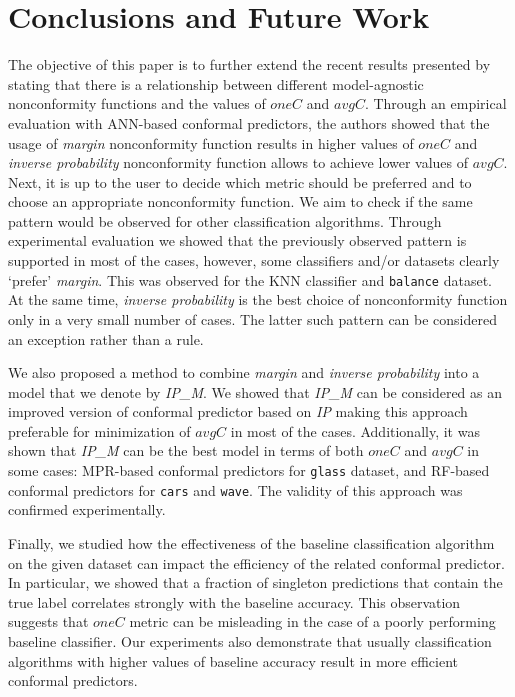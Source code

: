 \section{Conclusions and Future Work}
\label{sec:conclusions}

The objective of this paper is to further extend the recent results presented by
\cite{johansson2017model} stating that there is a relationship between different model-agnostic
nonconformity functions and the values of $oneC$ and $avgC$. Through an empirical evaluation with 
ANN-based conformal predictors, 
the authors showed that the usage of \textit{margin} nonconformity function results in higher values of
$oneC$ and \textit{inverse probability} nonconformity function allows to achieve lower values
of $avgC$. Next, it is up to the user to decide which metric should be preferred and to choose an
appropriate nonconformity function.
We aim to check if the same pattern would be observed for other classification algorithms.
Through experimental evaluation we showed that the previously observed pattern is supported in most of
the cases, however, some classifiers and/or datasets clearly `prefer' \textit{margin}.
This was observed for the KNN classifier and \verb|balance| dataset.
At the same time, \textit{inverse probability} is the best choice of nonconformity function only in
a very small number of cases. The latter such pattern can be considered an exception rather than a rule.

We also proposed a method to combine \textit{margin} and \textit{inverse probability} into a model 
that we denote by \textit{IP\_M}. We showed that \textit{IP\_M} can be considered as an improved 
version of conformal predictor based on \textit{IP} making this approach preferable for minimization
of $avgC$ in most of the cases. Additionally, it was shown that \textit{IP\_M} can be the best
model in terms of both $oneC$ and $avgC$ in some cases: MPR-based conformal predictors
for \verb|glass| dataset, and RF-based conformal predictors for \verb|cars| and \verb|wave|.
The validity of this approach was confirmed experimentally.

Finally, we studied how the effectiveness of the baseline classification algorithm on the given
dataset can impact the efficiency of the related conformal predictor. In particular, we showed
that a fraction of singleton predictions that contain the true label correlates strongly with 
the baseline accuracy. This observation suggests that $oneC$ metric can be misleading in
the case of a poorly performing baseline classifier. Our experiments also demonstrate that usually
classification algorithms with higher values of baseline accuracy result in more efficient
conformal predictors.

